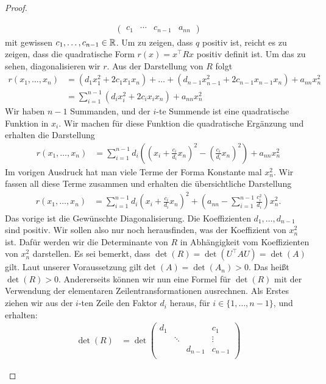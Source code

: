 \begin{proof}
\begin{itemize}
\begin{align*}
\begin{pmatrix}
					c_1 & \cdots & c_{n-1} & a_{nn}
				\end{pmatrix}
			\end{align*}
			mit gewissen $ c_1, \ldots, c_{n-1} \in \mathbb R $. Um zu zeigen, dass $ q $ positiv ist, reicht es zu zeigen, dass die quadratische Form $ r(x) = x^\top Rx $ positiv definit ist. Um das zu sehen, diagonalisieren wir $r$. Aus der Darstellung von $R$ folgt
			\begin{align*}
				r(x_1, \ldots, x_n) &= (d_1x_1^2 + 2c_1x_1x_n) + \ldots + (d_{n-1}x_{n-1}^2 + 2c_{n-1}x_{n-1}x_n) + a_{nn}x_n^2 \
				\\ &= \sum_{i=1}^{n-1} (d_ix_i^2 + 2c_ix_ix_n) + a_{nn}x_n^2
			\end{align*}
			Wir haben $n-1$ Summanden, und der $i$-te Summende ist eine quadratische Funktion in $x_i$. Wir machen für diese Funktion die quadratische Ergänzung und erhalten die Darstellung
			\begin{align*}
				r(x_1,\ldots,x_n) &= \sum_{i=1}^{n-1} d_i \left( (x_i + \frac{c_i}{d_i} x_n)^2 - \left(\frac{c_i}{d_i} x_n\right)^2 \right) + a_{nn}x_n^2 
			\end{align*}
			Im vorigen Ausdruck hat man viele Terme der Forma Konstante mal $x_n^2$. Wir fassen all diese Terme zusammen und erhalten die übersichtliche Darstellung 
			\begin{align}
				r(x_1,\ldots,x_n) &= \sum_{i=1}^{n-1} d_i \left( x_i + \frac{c_i}{d_i} x_n \right)^2 + \left( a_{nn} -  \sum_{i=1}^{n-1} \frac{c_i^2}{d_i} \right) x_n^2. \label{r:diag:repr}
			\end{align}
			Das vorige ist die Gewünschte Diagonalisierung. Die Koeffizienten $d_1,\ldots,d_{n-1}$ sind positiv. Wir sollen also nur noch herausfinden, was der Koeffizient von $x_n^2$ ist. Dafür werden wir die Determinante von $R$ in Abhängigkeit vom Koeffizienten von $x_n^2$ darstellen. 
			Es sei bemerkt, dass $ \det(R) = \det(U^\top A U) = \det(A)$ gilt. Laut unserer Voraussetzung gilt$\det(A)= \det(A_n) > 0 $. Das heißt $\det(R)>0$. Andererseits können wir nun eine Formel für $\det(R)$ mit der Verwendung der elementaren Zeilentransformationen ausrechnen. 
			Als Erstes ziehen wir aus der $i$-ten Zeile den Faktor $d_i$ heraus, für $i \in  \{1,\ldots,n-1\}$, und erhalten: 
			\begin{align*}
				\det(R) &= \det\begin{pmatrix}
					d_1 &&& c_1 \\
					& \ddots && \vdots \\
					&& d_{n-1} & c_{n-1} \\

\end{pmatrix}
\end{align*}
\end{itemize}
\end{proof}
